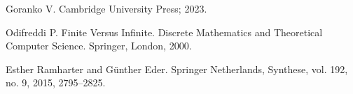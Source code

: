 \documentclass[openany]{book}
\theoremstyle{plain}
\theoremstyle{definition}
\begin{document}
\begin{thebibliography}{2}
Goranko V.
\newblock Cambridge University Press; 2023.

Odifreddi P.
\newblock Finite Versus Infinite. Discrete Mathematics and Theoretical Computer Science. Springer, London, 2000.

Esther Ramharter and G\"{u}nther Eder.
\newblock Springer Netherlands, Synthese, vol. 192, no. 9, 2015, 2795--2825.


\end{thebibliography}
\end{document}
